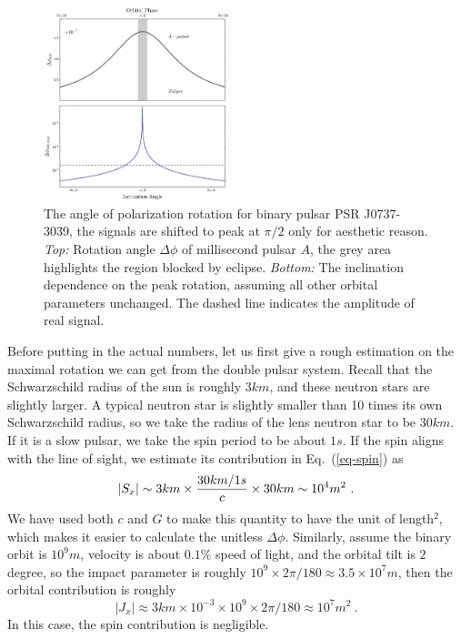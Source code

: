\documentclass[aps,showpacs,twocolumn,floats,prd,superscriptaddress,nofootinbib]{revtex4-1}
\begin{document}
\begin{figure}
\includegraphics[width=0.48\textwidth]{rotang.eps}
\caption{\label{fig:rotang}
The angle of polarization rotation for binary pulsar PSR J0737-3039, the signals are shifted to peak at $\pi/2$ only for aesthetic reason. 
{\it Top:} Rotation angle $\Delta \phi$ of millisecond pulsar $A$, the grey area highlights the region blocked by eclipse. 
{\it Bottom:}  The inclination dependence on the peak rotation, assuming all other orbital parameters unchanged. The dashed line indicates the amplitude of real signal.
 }
\end{figure}


Before putting in the actual numbers, let us first give a rough estimation on the maximal rotation we can get from the double pulsar system.
Recall that the Schwarzschild radius of the sun is roughly $3km$, and these neutron stars are slightly larger.
A typical neutron star is slightly smaller than 10 times its own Schwarzschild radius, so we take the radius of the lens neutron star to be $30km$.
If it is a slow pulsar, we take the spin period to be about $1s$.
If the spin aligns with the line of sight, we estimate its contribution in Eq.~(\ref{eq-spin}) as
\begin{equation}
|S_x|  \sim  3km \times \frac{30km/1s}{c} \times 30km \sim 10^4 m^2~. \nonumber \\
{\color{red}   
}
\end{equation}
We have used both $c$ and $G$ to make this quantity to have the unit of length$^2$, which makes it easier to calculate the unitless $\Delta\phi$.
Similarly, assume the binary orbit is $10^9 m$, velocity is about $0.1\%$ speed of light, and the orbital tilt is $2$ degree, so the impact parameter is roughly $10^9 \times 2\pi/180 \approx 3.5 \times 10^7 m$, then the orbital contribution is roughly
\begin{equation}
|J_x| \approx  3km \times 10^{-3} \times 10^9 \times 2\pi/180  \approx 10^7 m^2~.
\end{equation}
In this case, the spin contribution is negligible.
\end{document}
